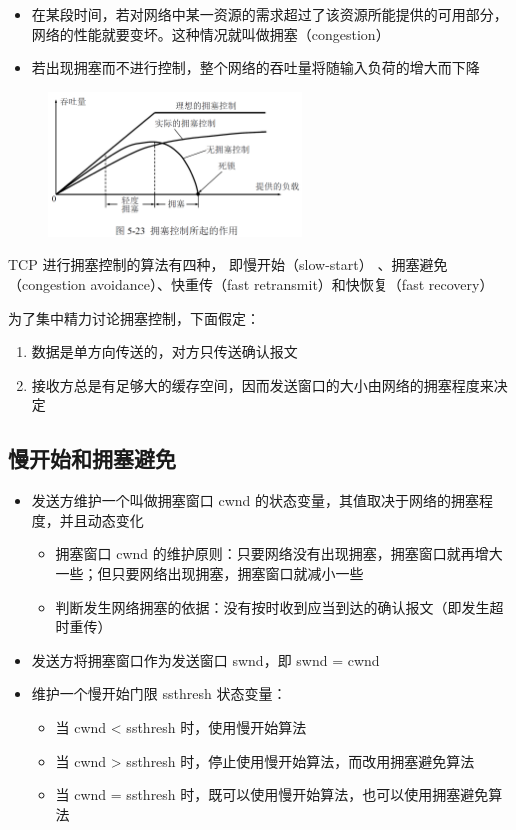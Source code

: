 \documentclass[cs4size,a4paper,10pt]{ctexart}
\begin{document}
	\begin{itemize}
		\item 在某段时间，若对网络中某一资源的需求超过了该资源所能提供的可用部分，网络的性能就要变坏。这种情况就叫做拥塞（congestion）
		\item 若出现拥塞而不进行控制，整个网络的吞吐量将随输入负荷的增大而下降
	\end{itemize}

	\begin{figure}[H]
		\centering
		\includegraphics[width=0.6\textwidth]{img/5.23}
	\end{figure}

	TCP 进行拥塞控制的算法有四种， 即慢开始（slow-start） 、拥塞避免（congestion
	avoidance）、快重传（fast retransmit）和快恢复（fast recovery）

	为了集中精力讨论拥塞控制，下面假定：
	\begin{enumerate}[label=\arabic*.]
		\item 数据是单方向传送的，对方只传送确认报文
		\item 接收方总是有足够大的缓存空间，因而发送窗口的大小由网络的拥塞程度来决定
	\end{enumerate}

	\subsection{慢开始和拥塞避免}
	\begin{itemize}
		\item 发送方维护一个叫做拥塞窗口 cwnd 的状态变量，其值取决于网络的拥塞程度，并且动态变化
		\begin{itemize}
			\item 拥塞窗口 cwnd 的维护原则：只要网络没有出现拥塞，拥塞窗口就再增大一些；但只要网络出现拥塞，拥塞窗口就减小一些
			\item 判断发生网络拥塞的依据：没有按时收到应当到达的确认报文（即发生超时重传）
		\end{itemize}
		\item 发送方将拥塞窗口作为发送窗口 swnd，即 swnd = cwnd
		\item 维护一个慢开始门限 ssthresh 状态变量：
		\begin{itemize}
			\item 当 cwnd < ssthresh 时，使用慢开始算法
			\item 当 cwnd > ssthresh 时，停止使用慢开始算法，而改用拥塞避免算法
			\item 当 cwnd = ssthresh 时，既可以使用慢开始算法，也可以使用拥塞避免算法
		\end{itemize}
	\end{itemize}
\end{document}
